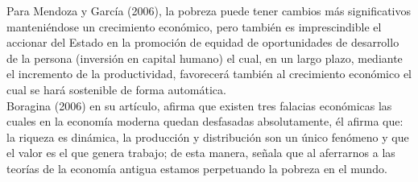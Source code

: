 Para Mendoza y García (2006), la pobreza puede tener cambios más significativos manteniéndose un crecimiento económico, pero también es imprescindible el accionar del Estado en la promoción de equidad de oportunidades de desarrollo de la persona (inversión en capital humano) el cual, en un largo plazo, mediante el incremento de la productividad, favorecerá también al crecimiento económico el cual se hará sostenible de forma automática.\\
Boragina (2006) en su artículo, afirma que existen tres falacias económicas las cuales en la economía moderna quedan desfasadas absolutamente, él afirma que: la riqueza es dinámica, la producción y distribución son un único fenómeno y que el valor es el que genera trabajo; de esta manera, señala que al aferrarnos a las teorías de la economía antigua estamos perpetuando la pobreza en el mundo.






